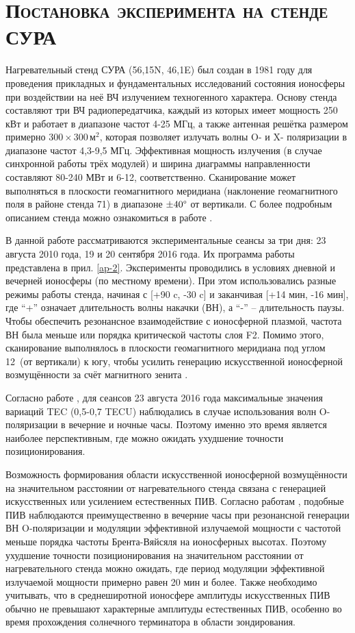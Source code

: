 \section{\textsc{Постановка эксперимента на стенде СУРА}}

Нагревательный стенд СУРА (56,15\degree N, 46,1\degree E) был создан в 1981 году для проведения прикладных и фундаментальных исследований состояния ионосферы при воздействии на неё ВЧ излучением техногенного характера.  
Основу стенда составляют три ВЧ радиопередатчика, каждый из которых имеет мощность 250 кВт и работает в диапазоне частот 4-25 МГц, а также антенная решётка размером примерно $300\times300\,\text{м}^2$, которая позволяет излучать волны O- и X- поляризации в диапазоне частот 4,3-9,5 МГц. 
Эффективная мощность излучения (в случае синхронной работы трёх модулей) и ширина диаграммы направленности составляют 80-240 МВт и 6-12\degree, соответственно.  
Сканирование может выполняться в плоскости геомагнитного меридиана (наклонение геомагнитного поля в районе стенда 71\degree) в диапазоне $\pm40\degree$ от вертикали.     
С более подробным описанием стенда можно ознакомиться в работе \cite{Belikovich2007}.

В данной работе рассматриваются экспериментальные сеансы за три дня: 23 августа 2010 года, 19 и 20 сентября 2016 года. 
Их программа работы представлена в прил. \ref{ap-2}.
Эксперименты проводились в условиях дневной и вечерней ионосферы (по местному времени).
При этом использовались разные режимы работы стенда, начиная с [+90 c, -30 c] и заканчивая [+14 мин, -16 мин], где ``+'' означает длительность волны накачки (ВН), а ``-'' -- длительность паузы.  
Чтобы обеспечить резонансное взаимодействие с ионосферной плазмой, частота ВН была меньше или порядка критической частоты слоя F2. 
Помимо этого, сканирование выполнялось в плоскости геомагнитного меридиана под углом 12\degree~(от вертикали) к югу, чтобы усилить генерацию искусственной ионосферной возмущённости за счёт магнитного зенита \cite{Streltsov2018, Tereshchenko2004}.

Согласно работе \cite{Kunitsyn2012}, для сеансов 23 августа 2016 года максимальные значения вариаций TEC (0,5-0,7 TECU) наблюдались в случае использования волн O-поляризации в вечерние и ночные часы.
Поэтому именно это время является наиболее перспективным, где можно ожидать ухудшение точности позиционирования. 

Возможность формирования области искусственной ионосферной возмущённости на значительном расстоянии от нагревательного стенда связана с генерацией искусственных или усилением естественных ПИВ.
Согласно работам \cite{Chernogor2011, Chernogor2013, Kunitsyn2012}, подобные ПИВ наблюдаются преимущественно в вечерние часы при резонансной генерации ВН O-поляризации и модуляции эффективной излучаемой мощности с частотой меньше порядка частоты Брента-Вяйсяля на ионосферных высотах. 
Поэтому ухудшение точности позиционирования на значительном расстоянии от нагревательного стенда можно ожидать, где период модуляции эффективной излучаемой мощности примерно равен 20 мин и более.
Также необходимо учитывать, что в среднеширотной ионосфере амплитуды искусственных ПИВ обычно не превышают характерные амплитуды естественных ПИВ, особенно во время прохождения солнечного терминатора в области зондирования.


